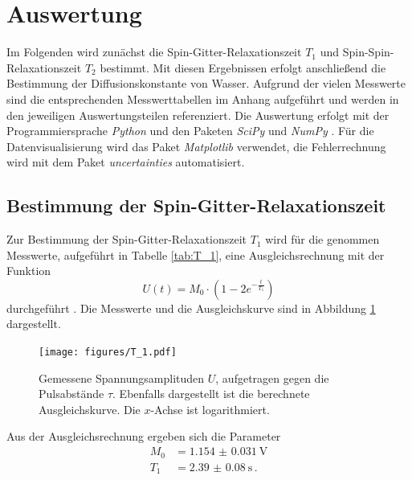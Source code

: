 \section{Auswertung}
Im Folgenden wird zunächst die Spin-Gitter-Relaxationszeit $T_1$
und Spin-Spin-Relaxationszeit $T_2$ bestimmt. Mit diesen Ergebnissen erfolgt anschließend die Bestimmung
der Diffusionskonstante von Wasser. Aufgrund der vielen Messwerte sind die entsprechenden 
Messwerttabellen im Anhang aufgeführt und werden in den jeweiligen Auswertungsteilen referenziert. 
Die Auswertung erfolgt mit der Programmiersprache \textit{Python} und den Paketen \textit{SciPy} \cite{SciPy} und
\textit{NumPy} \cite{NumPy}. Für die Datenvisualisierung wird das Paket \textit{Matplotlib} \cite{Matplotlib} 
verwendet, die Fehlerrechnung wird mit dem Paket \textit{uncertainties} \cite{uncertainties} automatisiert.

\subsection*{Bestimmung der Spin-Gitter-Relaxationszeit}
Zur Bestimmung der Spin-Gitter-Relaxationszeit $T_1$ wird für die genommen Messwerte, aufgeführt in Tabelle 
\ref{tab:T_1}, eine Ausgleichsrechnung mit der Funktion 
\begin{equation*}
    U(t) = M_0 \cdot \left(1 - 2 e^{-\frac{t}{T_1}}\right) 
\end{equation*}
durchgeführt \cite{Finke}. Die Messwerte und die Ausgleichskurve sind in Abbildung \ref{fig:T_1} dargestellt.
\begin{figure}
    \centering
    \texttt{[image: figures/T\_1.pdf]}
    \caption{Gemessene Spannungsamplituden $U$, aufgetragen gegen die Pulsabstände $\tau$. Ebenfalls dargestellt
            ist die berechnete Ausgleichskurve. Die $x$-Achse ist logarithmiert.}
    \label{fig:T_1}
\end{figure}
Aus der Ausgleichsrechnung ergeben sich die Parameter
\begin{align*}
    M_0 &= \SI{1.154(31)}{\volt} \\
    T_1 &= \SI{2.39(8)}{\second} \, .
\end{align*}

